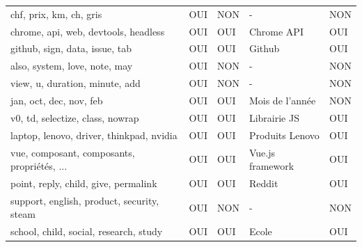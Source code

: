 \begin{longtable}{lllll}
\scriptsize chf, prix, km, ch, gris                            & \cellcolor[HTML]{9AFF99}OUI & \cellcolor[HTML]{FFCCC9}NON & -                         & \cellcolor[HTML]{FFCCC9}NON \\
\scriptsize chrome, api, web, devtools, headless               & \cellcolor[HTML]{9AFF99}OUI & \cellcolor[HTML]{9AFF99}OUI & Chrome API                & \cellcolor[HTML]{9AFF99}OUI \\
\scriptsize github, sign, data, issue, tab                     & \cellcolor[HTML]{9AFF99}OUI & \cellcolor[HTML]{9AFF99}OUI & Github                    & \cellcolor[HTML]{9AFF99}OUI \\
\scriptsize also, system, love, note, may                      & \cellcolor[HTML]{9AFF99}OUI & \cellcolor[HTML]{FFCCC9}NON & -                         & \cellcolor[HTML]{FFCCC9}NON \\
\scriptsize view, u, duration, minute, add                     & \cellcolor[HTML]{9AFF99}OUI & \cellcolor[HTML]{FFCCC9}NON & -                         & \cellcolor[HTML]{FFCCC9}NON \\
\scriptsize jan, oct, dec, nov, feb                            & \cellcolor[HTML]{9AFF99}OUI & \cellcolor[HTML]{9AFF99}OUI & Mois de l'année           & \cellcolor[HTML]{FFCCC9}NON \\
\scriptsize v0, td, selectize, class, nowrap                   & \cellcolor[HTML]{9AFF99}OUI & \cellcolor[HTML]{9AFF99}OUI & Librairie JS              & \cellcolor[HTML]{9AFF99}OUI \\
\scriptsize laptop, lenovo, driver, thinkpad, nvidia           & \cellcolor[HTML]{9AFF99}OUI & \cellcolor[HTML]{9AFF99}OUI & Produits Lenovo           & \cellcolor[HTML]{9AFF99}OUI \\
\scriptsize vue, composant, composants, propriétés, ...    & \cellcolor[HTML]{9AFF99}OUI & \cellcolor[HTML]{9AFF99}OUI & Vue.js framework          & \cellcolor[HTML]{9AFF99}OUI \\
\scriptsize point, reply, child, give, permalink               & \cellcolor[HTML]{9AFF99}OUI & \cellcolor[HTML]{9AFF99}OUI & Reddit                    & \cellcolor[HTML]{9AFF99}OUI \\
\scriptsize support, english, product, security, steam         & \cellcolor[HTML]{9AFF99}OUI & \cellcolor[HTML]{FFCCC9}NON & -                         & \cellcolor[HTML]{FFCCC9}NON \\
\scriptsize school, child, social, research, study             & \cellcolor[HTML]{9AFF99}OUI & \cellcolor[HTML]{9AFF99}OUI & Ecole                     & \cellcolor[HTML]{9AFF99}OUI \\

\end{longtable}
